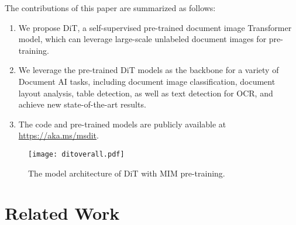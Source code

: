 \documentclass[sigconf]{acmart}
\begin{document}
The contributions of this paper are summarized as follows:

\begin{enumerate}
    \item We propose DiT, a self-supervised pre-trained document image Transformer model, which can leverage large-scale unlabeled document images for pre-training.
    \item We leverage the pre-trained DiT models as the backbone for a variety of Document AI tasks, including document image classification, document layout analysis, table detection, as well as text detection for OCR, and achieve new state-of-the-art results.
    \item The code and pre-trained models are publicly available at \url{https://aka.ms/msdit}.
\end{enumerate}

\begin{figure*}[t]
    \centering
	\texttt{[image: ditoverall.pdf]}	
    \caption{The model architecture of DiT with MIM pre-training.}
    \label{arch}
\end{figure*}


\section{Related Work}
\end{document}
